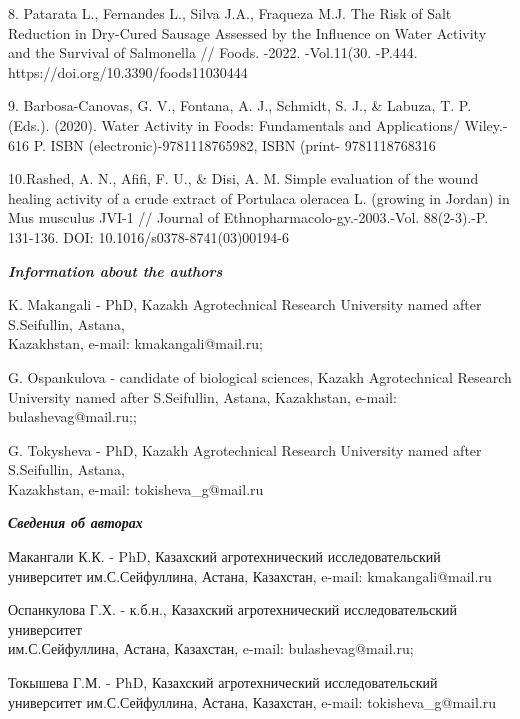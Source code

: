 \begin{noparindent}
8. Patarata L., Fernandes L., Silva J.A., Fraqueza M.J. The Risk of Salt
Reduction in Dry-Cured Sausage Assessed by the Influence on Water
Activity and the Survival of Salmonella // Foods. -2022. -Vol.11(30.
-P.444. https://doi.org/10.3390/foods11030444

9. Barbosa-Canovas, G. V., Fontana, A. J., Schmidt, S. J., \& Labuza, T.
P. (Eds.). (2020). Water Activity in Foods: Fundamentals and
Applications/ Wiley.- 616 P. ISBN (electronic)-9781118765982, ISBN
(print- 9781118768316

10.Rashed, A. N., Afifi, F. U., \& Disi, A. M. Simple evaluation of the
wound healing activity of a crude extract of Portulaca oleracea L.
(growing in Jordan) in Mus musculus JVI-1 // Journal of
Ethnopharmacolo-gy.-2003.-Vol. 88(2-3).-P. 131-136. DOI:
10.1016/s0378-8741(03)00194-6
\end{noparindent}

\emph{{\bfseries Information about the authors}}
\begin{noparindent}

K. Makangali - PhD, Kazakh Agrotechnical Research University named after
S.Seifullin, Astana, \\Kazakhstan, e-mail: kmakangali@mail.ru;

G. Ospankulova - candidate of biological sciences, Kazakh Agrotechnical
Research University named after S.Seifullin, Astana, Kazakhstan, e-mail:
bulashevag@mail.ru;;

G. Tokysheva - PhD, Kazakh Agrotechnical Research University named after
S.Seifullin, Astana, \\Kazakhstan, e-mail: tokisheva\_g@mail.ru
\end{noparindent}

\emph{{\bfseries Сведения об авторах}}
\begin{noparindent}

Макангали К.К. - PhD, Казахский агротехнический исследовательский
университет им.С.Сейфуллина, Астана, Казахстан, e-mail:
kmakangali@mail.ru

Оспанкулова Г.Х. - к.б.н., Казахский агротехнический исследовательский
университет \\им.С.Сейфуллина, Астана, Казахстан, e-mail:
bulashevag@mail.ru;

Токышева Г.М. - PhD, Казахский агротехнический исследовательский
университет им.С.Сейфуллина, Астана, Казахстан, e-mail:
tokisheva\_g@mail.ru

\end{noparindent}











